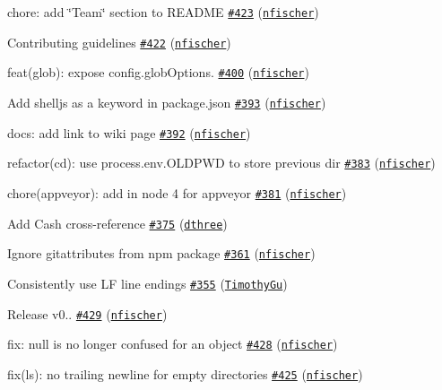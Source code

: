 \begin{DoxyItemize}
\item chore\+: add \char`\"{}\+Team\char`\"{} section to R\+E\+A\+D\+ME \href{https://github.com/shelljs/shelljs/pull/423}{\tt \#423} (\href{https://github.com/nfischer}{\tt nfischer})
\item Contributing guidelines \href{https://github.com/shelljs/shelljs/pull/422}{\tt \#422} (\href{https://github.com/nfischer}{\tt nfischer})
\item feat(glob)\+: expose config.\+glob\+Options. \href{https://github.com/shelljs/shelljs/pull/400}{\tt \#400} (\href{https://github.com/nfischer}{\tt nfischer})
\item Add shelljs as a keyword in package.\+json \href{https://github.com/shelljs/shelljs/pull/393}{\tt \#393} (\href{https://github.com/nfischer}{\tt nfischer})
\item docs\+: add link to wiki page \href{https://github.com/shelljs/shelljs/pull/392}{\tt \#392} (\href{https://github.com/nfischer}{\tt nfischer})
\item refactor(cd)\+: use process.\+env.\+O\+L\+D\+P\+WD to store previous dir \href{https://github.com/shelljs/shelljs/pull/383}{\tt \#383} (\href{https://github.com/nfischer}{\tt nfischer})
\item chore(appveyor)\+: add in node 4 for appveyor \href{https://github.com/shelljs/shelljs/pull/381}{\tt \#381} (\href{https://github.com/nfischer}{\tt nfischer})
\item Add Cash cross-\/reference \href{https://github.com/shelljs/shelljs/pull/375}{\tt \#375} (\href{https://github.com/dthree}{\tt dthree})
\item Ignore gitattributes from npm package \href{https://github.com/shelljs/shelljs/pull/361}{\tt \#361} (\href{https://github.com/nfischer}{\tt nfischer})
\item Consistently use LF line endings \href{https://github.com/shelljs/shelljs/pull/355}{\tt \#355} (\href{https://github.com/TimothyGu}{\tt Timothy\+Gu})
\item Release v0.. \href{https://github.com/shelljs/shelljs/pull/429}{\tt \#429} (\href{https://github.com/nfischer}{\tt nfischer})
\item fix\+: null is no longer confused for an object \href{https://github.com/shelljs/shelljs/pull/428}{\tt \#428} (\href{https://github.com/nfischer}{\tt nfischer})
\item fix(ls)\+: no trailing newline for empty directories \href{https://github.com/shelljs/shelljs/pull/425}{\tt \#425} (\href{https://github.com/nfischer}{\tt nfischer})

\end{DoxyItemize}
